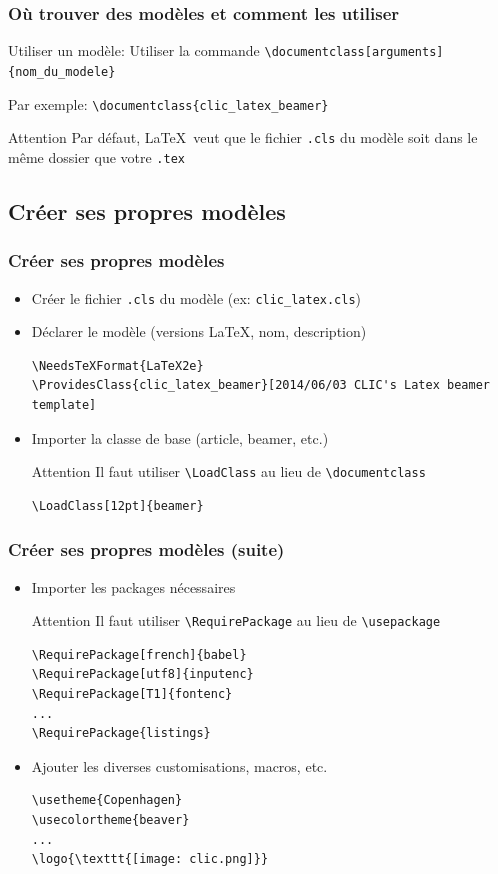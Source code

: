 \documentclass{clic_latex_beamer}
\begin{document}
\begin{frame}
\frametitle{Où trouver des modèles et comment les utiliser}
\begin{block}{Utiliser un modèle:}
 Utiliser la commande \texttt{\textbackslash documentclass[arguments]\{nom\_du\_modele\}}
\end{block}
Par exemple: \texttt{\textbackslash documentclass\{clic\_latex\_beamer\}}
\begin{alertblock}{Attention}
Par défaut, \LaTeX\ veut que le fichier \texttt{.cls} du modèle soit dans le même dossier que votre \texttt{.tex}
\end{alertblock}
 \end{frame}

\subsection{Créer ses propres modèles}
\begin{frame}[fragile]
\frametitle{Créer ses propres modèles}
 \begin{itemize}
    \item Créer le fichier \texttt{.cls} du modèle (ex: \texttt{clic\_latex.cls})
    \item Déclarer le modèle (versions \LaTeX, nom, description)
\begin{lstlisting}
\NeedsTeXFormat{LaTeX2e}
\ProvidesClass{clic_latex_beamer}[2014/06/03 CLIC's Latex beamer template]
\end{lstlisting}
    \item Importer la classe de base (article, beamer, etc.)
\begin{alertblock}{Attention}
 Il faut utiliser \texttt{\textbackslash LoadClass} au lieu de \texttt{\textbackslash documentclass}
\end{alertblock}
\begin{lstlisting}
\LoadClass[12pt]{beamer}
\end{lstlisting}
      
\end{itemize}
\end{frame}
 
 \begin{frame}[fragile]
\frametitle{Créer ses propres modèles (suite)}
\begin{itemize}
\item Importer les packages nécessaires
\begin{alertblock}{Attention}
 Il faut utiliser \texttt{\textbackslash RequirePackage} au lieu de \texttt{\textbackslash usepackage}
\end{alertblock}
\begin{lstlisting}
\RequirePackage[french]{babel}
\RequirePackage[utf8]{inputenc}
\RequirePackage[T1]{fontenc}
...
\RequirePackage{listings}
\end{lstlisting}
\item Ajouter les diverses customisations, macros, etc.
\begin{lstlisting}
\usetheme{Copenhagen}
\usecolortheme{beaver}
...
\logo{\texttt{[image: clic.png]}}
\end{lstlisting}
\end{itemize}
\end{frame}
 
\end{document}
